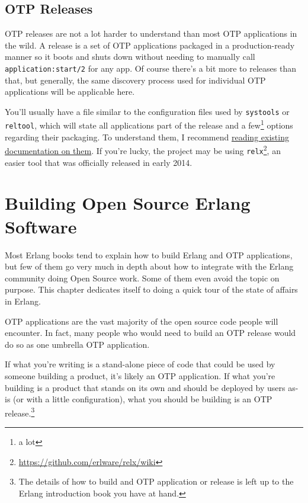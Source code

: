 \documentclass[11pt, oneside]{book}   	%
\newcommand{\app}[1]{\Verb`#1`}
\newcommand{\module}[1]{\Verb`#1`}
\newcommand{\function}[1]{\Verb`#1`}
\begin{document}
\section{OTP Releases}
\label{sec:dive-otp-releases}

OTP releases are not a lot harder to understand than most OTP applications in the wild. A release is a set of OTP applications packaged in a production-ready manner so it boots and shuts down without needing to manually call \function{application:start/2} for any app. Of course there's a bit more to releases than that, but generally, the same discovery process used for individual OTP applications will be applicable here.

You'll usually have a file similar to the configuration files used by \module{systools} or \module{reltool}, which will state all applications part of the release and a few\footnote{a lot} options regarding their packaging. To understand them, I recommend \href{http://learnyousomeerlang.com/release-is-the-word}{reading existing documentation on them}. If you're lucky, the project may be using \app{relx}\footnote{\href{https://github.com/erlware/relx/wiki}{https://github.com/erlware/relx/wiki}}, an easier tool that was officially released in early 2014.


\chapter{Building Open Source Erlang Software}
\label{chap:building-open-source-erlang-software}

Most Erlang books tend to explain how to build Erlang and OTP applications, but few of them go very much in depth about how to integrate with the Erlang community doing Open Source work. Some of them even avoid the topic on purpose. This chapter dedicates itself to doing a quick tour of the state of affairs in Erlang.

OTP applications are the vast majority of the open source code people will encounter. In fact, many people who would need to build an OTP release would do so as one umbrella OTP application. 

If what you're writing is a stand-alone piece of code that could be used by someone building a product, it's likely an OTP application. If what you're building is a product that stands on its own and should be deployed by users as-is (or with a little configuration), what you should be building is an OTP release.\footnote{The details of how to build and OTP application or release is left up to the Erlang introduction book you have at hand.}
\end{document}
